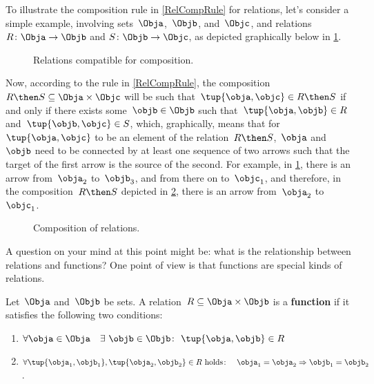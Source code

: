 To illustrate the composition rule in \cref{RelCompRule} for relations, let's consider a simple example, involving sets~$\Obja$,~$\Objb$, and~$\Objc$, and relations~$R \colon \Obja \to \Objb$ and $S \colon \Objb \to \Objc$, as depicted graphically below in \cref{fig:example_rel_composable}.
\begin{figure}[h!]
\centering
{}
 \caption{Relations compatible for composition.}
\label{fig:example_rel_composable}
\end{figure}
Now, according to the rule in \cref{RelCompRule}, the composition~$R \then S \subseteq \Obja \times \Objc$ will be such that~$\tup{\obja,\objc} \in R \then S$ if and only if there exists some~$\objb \in \Objb$ such that~$\tup{\obja,\objb} \in R$ and~$\tup{\objb,\objc} \in S$, which, graphically, means that for~$\tup{\obja,\objc}$ to be an element of the relation~$R \then S$,~$\obja$ and~$\objb$ need to be connected by at least one sequence of two arrows such that the target of the first arrow is the source of the second. For example, in \cref{fig:example_rel_composable}, there is an arrow from~$\obja_2$ to~$\objb_3$, and from there on to~$\objc_1$, and therefore, in the composition~$R \then S$ depicted in \cref{fig:example_rel_composed}, there is an arrow from~$\obja_2$ to~$\objc_1$.
\begin{figure}[h!]
\centering
{}
 \caption{Composition of relations.}
\label{fig:example_rel_composed}
\end{figure}

A question on your mind at this point might be: what is the relationship between relations and functions? One point of view is that functions are special kinds of relations.

\begin{definition}
\label{def:functions_as_relations}
Let~$\Obja$ and~$\Objb$ be sets. A relation~$R \subseteq \Obja \times \Objb$ is a \textbf{function} if it satisfies the following two conditions:
\begin{enumerate}
\item $\forall \obja \in \Obja \quad \exists \ \objb \in \Objb\colon  \ \tup{\obja,\objb} \in R$
\item $\forall \tup{\obja_1, \objb_1}, \tup{\obja_2, \objb_2} \in R  \text{ holds}\colon \quad \obja_1 = \obja_2 \Rightarrow \objb_1 = \objb_2$.
\end{enumerate}
\end{definition}

